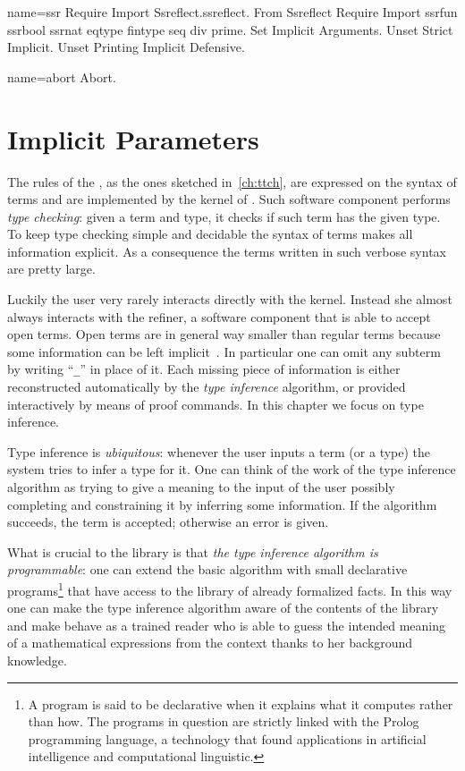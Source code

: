 \begin{coqdef}{name=ssr}
Require Import Ssreflect.ssreflect.
From Ssreflect Require Import ssrfun ssrbool ssrnat eqtype fintype seq div prime.
Set Implicit Arguments.
Unset Strict Implicit.
Unset Printing Implicit Defensive.
\end{coqdef}
\begin{coqdef}{name=abort}
Abort.
\end{coqdef}

\chapter{Implicit Parameters}{}

The rules of the \mcbCIC{}, as the ones sketched in~\ref{ch:ttch},
are expressed on the syntax of terms and
are implemented by the kernel of \Coq{}.  Such software component
performs \emph{type checking}: given a term and type, it checks if such
term has the given type.  To keep type checking simple and decidable
the syntax of terms makes all information explicit. As a consequence
the terms written in such verbose syntax are pretty large.

Luckily the user very rarely interacts directly with the kernel.
Instead she almost always interacts with the refiner, a software
component that is able to accept open terms.  Open terms are in
general way smaller than regular terms because some information can be
left implicit~\cite{Pollack92implicitsyntax}.
In particular one can omit any subterm by writing
``\lstinline/_/'' in place of it.
Each missing piece of information is either reconstructed
automatically by the \emph{type inference} algorithm, or provided
interactively by means of proof commands.  In this chapter we
focus on type inference.

Type inference is \emph{ubiquitous}: whenever the user inputs a term
(or a type) the system tries to infer a type for it.
One can think of the work of the type inference
algorithm as trying to give a meaning to the input of the
user possibly completing and constraining it by inferring some
information.  If the algorithm succeeds, the term is accepted;
otherwise an error is given.

What is crucial to the \mcbMC{} library is that
\emph{the type inference algorithm is programmable}:
one can extend the
basic algorithm with small declarative programs\footnote{A program is
said to be declarative when it explains what it computes rather than
how. The programs in question are strictly linked with the Prolog
programming language, a technology that found applications in artificial
intelligence and computational linguistic.}
that have access to
the library of already formalized facts.  In this way one can make the
type inference algorithm aware of the contents of the library and
make \Coq{} behave as a trained reader who is able to guess the
intended meaning of a mathematical expressions from the context
thanks to her background knowledge.

